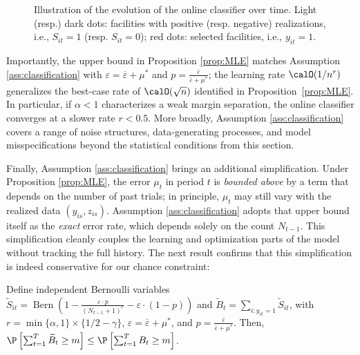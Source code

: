 \documentclass[blindrev]{informs3noheader}
\DeclareMathOperator{\Bern}{Bern}
\begin{document}
\begin{figure}[h!]
{
    }
    \caption{Illustration of the evolution of the online classifier over time. Light (resp.) dark dots: facilities with positive (resp. negative) realizations, i.e., $S_{it}=1$ (resp. $S_{it}=0$); red dots: selected facilities, i.e., $y_{it}=1$.}
    \label{fig:error}
    \vspace{-12pt}
\end{figure}
Importantly, the upper bound in Proposition \ref{prop:MLE} matches Assumption \ref{ass:classification} with $\varepsilon = \overline\varepsilon + \mu^*$ and $p=\frac{\overline\varepsilon}{\overline\varepsilon+\mu^*}$; the learning rate $\calO(1/n^r)$ generalizes the best-case rate of $\calO(\sqrt n)$ identified in Proposition~\ref{prop:MLE}. In particular, if $\alpha<1$ characterizes a weak margin separation, the online classifier converges at a slower rate $r<0.5$. More broadly, Assumption \ref{ass:classification} covers a range of noise structures, data-generating processes, and model misspecifications beyond the statistical conditions from this section.

Finally, Assumption \ref{ass:classification} brings an additional simplification. Under Proposition \ref{prop:MLE}, the error $\mu_t$ in period $t$ is \textit{bounded above} by a term that depends on the number of past trials; in principle, $\mu_t$ may still vary with the realized data $(y_{is},z_{is})$. Assumption \ref{ass:classification} adopts that upper bound itself as the \textit{exact} error rate, which depends solely on the count $N_{t-1}$. This simplification cleanly couples the learning and optimization parts of the model without tracking the full history. The next result confirms that this simplification is indeed conservative for our chance constraint:
\begin{corollary} \label{cor:learning}
    Define independent Bernoulli variables $\widetilde{S}_{it}=\Bern\left(1-\frac{\varepsilon\cdot p}{\left(N_{t-1} + 1\right)^r}-\varepsilon\cdot(1-p)\right)$ and $\widetilde{B}_t = \sum_{i:y_{it}=1} \widetilde{S}_{it}$, with $r=\min\{\alpha,1\} \times \{1/2-\gamma\}$, $\varepsilon = \overline\varepsilon + \mu^*$, and $p = \frac{\overline\varepsilon}{\overline\varepsilon+\mu^*}$. Then, $\P\left[\sum_{t=1}^T\widetilde{B}_t\geq m\right] \leq \P\left[\sum_{t=1}^TB_t\geq m\right]$.
\end{corollary}
\end{document}
